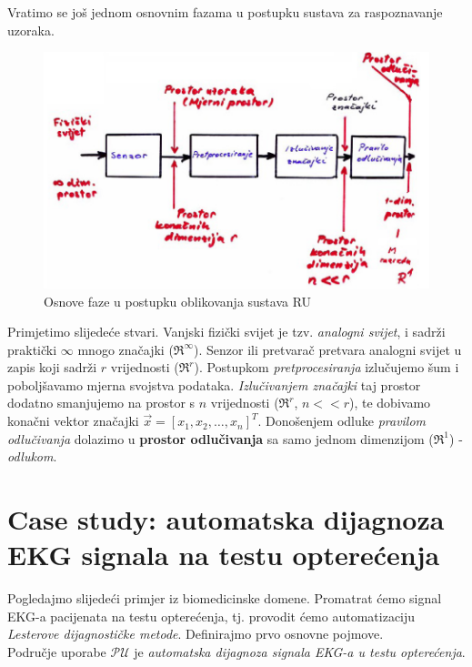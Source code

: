 \documentclass{book}
\begin{document}
Vratimo se još jednom osnovnim fazama u postupku sustava za raspoznavanje
uzoraka.

\begin{figure}[H]
 \begin{center}
 \includegraphics[scale=0.5]{./pics/faze_second}
 \caption{Osnove faze u postupku oblikovanja sustava RU}
 \end{center}
 \end{figure}

Primjetimo slijedeće stvari. Vanjski fizički svijet je tzv. \textit{analogni
svijet}, i sadrži praktički $\infty$ mnogo značajki ($\Re^{\infty}$). Senzor ili
pretvarač pretvara analogni svijet u zapis koji sadrži $r$ vrijednosti ($\Re^{r}$).
Postupkom \textit{pretprocesiranja} izlučujemo šum i poboljšavamo mjerna
svojstva podataka. \textit{Izlučivanjem značajki} taj prostor dodatno smanjujemo
na prostor s $n$ vrijednosti ($\Re^{r}$, $n << r$), te dobivamo konačni vektor
značajki $\vec{x} = [ x_1, x_2, \ldots, x_n ]^T$. Donošenjem
odluke \textit{pravilom odlučivanja} dolazimo u \textbf{prostor odlučivanja} sa
samo jednom dimenzijom ($\Re^{1}$) - \textit{odlukom}.

\section{Case study: automatska dijagnoza EKG signala na testu opterećenja} 

Pogledajmo slijedeći primjer iz biomedicinske domene. Promatrat ćemo signal
EKG-a pacijenata na testu opterećenja, tj. provodit ćemo automatizaciju
\textit{Lesterove dijagnostičke metode}.  Definirajmo prvo osnovne pojmove.
\\

Područje uporabe $\mathcal{PU}$ je \textit{automatska dijagnoza signala EKG-a u
testu opterećenja}. \\ 
\end{document}
